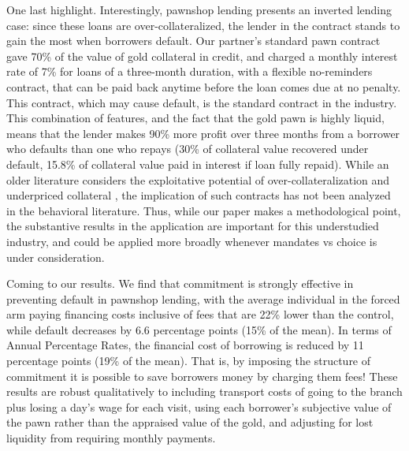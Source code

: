 \documentclass[oneside,11pt]{article}
\begin{document}
One last highlight. Interestingly, pawnshop lending presents an inverted lending case: since these loans are over-collateralized, the lender in the contract stands to gain the most when borrowers default.  Our partner's standard pawn contract gave 70\% of the value of gold collateral in credit, and charged a monthly interest rate of 7\% for loans of a three-month duration, with a flexible no-reminders contract, that can be paid back anytime before the loan comes due at no penalty. This contract, which may cause default, is the standard contract in the industry. This combination of features, and the fact that the gold pawn is highly liquid, means that the lender makes 90\% more profit over three months from a borrower who defaults than one who repays (30\% of collateral value recovered under default, 15.8\% of collateral value paid in interest if loan fully repaid). While an older literature considers the exploitative potential of over-collateralization and underpriced collateral \citep{basu1984implicit}, the implication of such contracts has not been analyzed in the behavioral literature. Thus, while our paper makes a methodological point, the substantive results in the application are important for this understudied industry, and could be applied more broadly whenever mandates vs choice is under consideration.  %
	
Coming to our results. We find that commitment is strongly effective in preventing default in pawnshop lending, with the average individual in the forced arm paying financing costs inclusive of fees that are 22\% lower than the control, while default decreases by 6.6 percentage points (15\% of the mean). In terms of Annual Percentage Rates, the financial cost of borrowing is reduced by 11 percentage points (19\% of the mean). That is, by imposing the structure of commitment it is possible to save borrowers money by charging them fees! These results are robust qualitatively to including transport costs of going to the branch plus losing a day's wage for each visit, using each borrower's subjective value of the pawn rather than the appraised value of the gold, and adjusting for lost liquidity from requiring monthly payments.
\end{document}
